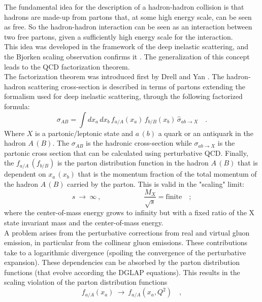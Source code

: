 The fundamental idea for the description of a hadron-hadron collision is that hadrons are made-up from partons that, at some high energy scale, can be seen as free. So the hadron-hadron interaction can be seen as an interaction between two free partons, given a sufficiently high energy scale for the interaction.
\\
This idea was developed in the framework of the deep inelastic scattering, and the Bjorken scaling observation confirms it \cite{Bjorken:1968dy}. The generalization of this concept leads to the QCD factorization theorem. 
\\   
The factorization theorem was introduced first by Drell and Yan \cite{DRELL1971578}. 
The hadron-hadron scattering cross-section is described in terms of partons extending the formalism used for deep inelastic scattering, through the following factorized formula:
\begin{equation}
\sigma_{AB}=\displaystyle\int dx_a\,dx_b\,f_{a/A}(x_a)\,f_{b/B}(x_b)\,\hat{\sigma}_{ab \rightarrow X}\quad .
\label{eq:factorization1}
\end{equation}
Where $X$ is a partonic/leptonic state and $a\,(b)$ a quark or an antiquark in the hadron $A\,(B)$. The $\sigma_{AB}$ is the hadronic cross-section while $\sigma_{ab\rightarrow X}$ is the partonic cross section that can be calculated using perturbative QCD. Finally, the $f_{a/A}\,(f_{b/B})$ is the parton distribution function in the hadron $A\,(B)$ that is dependent on $x_a\,(x_b)$ that is the momentum fraction of the total momentum of the hadron $A\,(B)$ carried by the parton. This is valid in the "scaling" limit:
\begin{equation}
	s\ \longrightarrow\ \infty\ , \qquad\qquad\qquad \frac{M_X}{\sqrt{s}}=\text{finite}\quad ;
\end{equation}
where the center-of-mass energy grows to infinity but with a fixed ratio of the X state invariant mass and the center-of-mass energy.
\\
A problem arises from the perturbative corrections from real and virtual gluon emission, in particular from the collinear gluon emissions. These contributions take to a logarithmic divergence (spoiling the convergence of the perturbative expansion). These dependencies can be absorbed by the parton distribution functions (that evolve according the DGLAP equations). This results in the scaling violation of the parton distribution functions
\begin{equation}
	f_{a/A}(x_a)\ \longrightarrow\ f_{a/A}(x_a, Q^2)\quad , 
\end{equation}  
